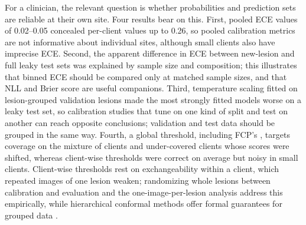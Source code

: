 \documentclass[VANCOUVER,Times1COL]{WileyNJDv5}
\begin{document}
For a clinician, the relevant question is whether probabilities and prediction sets are reliable at their
own site. Four results bear on this. First, pooled ECE values of 0.02--0.05 concealed per-client values up
to 0.26, so pooled calibration metrics are not informative about individual sites, although small clients
also have imprecise ECE. Second, the apparent difference in ECE between new-lesion and full leaky test sets was explained by
sample size and composition; this illustrates that binned ECE should be compared only at matched sample
sizes, and that NLL and Brier score are useful companions. Third, temperature scaling fitted on lesion-grouped validation
lesions made the most strongly fitted models worse on a leaky test set, so calibration studies that tune on
one kind of split and test on another can reach opposite conclusions; validation and test data should be
grouped in the same way. Fourth, a global threshold, including FCP's \cite{lu2023fcp}, targets coverage on
the mixture of clients and under-covered clients whose scores were shifted, whereas client-wise thresholds
were correct on average but noisy in small clients. Client-wise thresholds rest on exchangeability within a
client, which repeated images of one lesion weaken; randomizing whole lesions between calibration and
evaluation and the one-image-per-lesion analysis address this empirically, while hierarchical conformal
methods offer formal guarantees for grouped data \cite{dunn2022hierarchical,lee2023hierarchical}.
\end{document}
